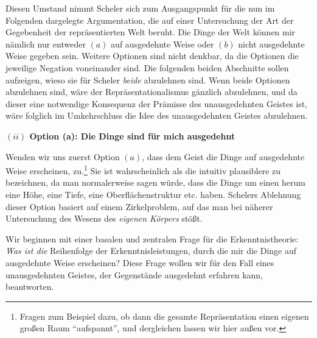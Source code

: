 \documentclass[a4paper, 12pt]{article}
\begin{document}
\begin{onehalfspace}

Diesen Umstand nimmt Scheler sich zum Ausgangspunkt für die nun im Folgenden dargelegte Argumentation, die auf einer Untersuchung der Art der Gegebenheit der repräsentierten Welt beruht. Die Dinge der Welt können mir nämlich nur entweder $(a)$ auf ausgedehnte Weise oder $(b)$ nicht ausgedehnte Weise gegeben sein. Weitere Optionen sind nicht denkbar, da die Optionen die jeweilige Negation voneinander sind. Die folgenden beiden Abschnitte sollen aufzeigen, wieso sie für Scheler \emph{beide} abzulehnen sind. Wenn beide Optionen abzulehnen sind, wäre der Repräsentationalismus gänzlich abzulehnen, und da dieser eine notwendige Konsequenz der Prämisse des unausgedehnten Geistes ist, wäre folglich im Umkehrschluss die Idee des unausgedehnten Geistes abzulehnen.

\vspace{5mm}
\noindent\textbf{$(ii)$ Option (a): Die Dinge sind für mich ausgedehnt}


\noindent Wenden wir uns zuerst Option $(a)$, dass dem Geist die Dinge auf ausgedehnte Weise erscheinen, zu.\footnote{Fragen zum Beispiel dazu, ob dann die gesamte Repräsentation einen eigenen großen Raum "`aufspannt"', und dergleichen lassen wir hier außen vor.} Sie ist wahrscheinlich als die intuitiv plausiblere zu bezeichnen, da man normalerweise sagen würde, dass die Dinge um einen herum eine Höhe, eine Tiefe, eine Oberflächenstruktur etc. haben. Schelers Ablehnung dieser Option basiert auf einem Zirkelproblem, auf das man bei näherer Untersuchung des Wesens des \emph{eigenen Körpers} stößt.


Wir beginnen mit einer basalen und zentralen Frage für die Erkenntnistheorie: \emph{Was ist die} Reihenfolge der Erkenntnisleistungen, durch die mir die Dinge auf ausgedehnte Weise erscheinen? Diese Frage wollen wir für den Fall eines unausgedehnten Geistes, der Gegenstände ausgedehnt erfahren kann, beantworten. 


\end{onehalfspace}
\end{document}
